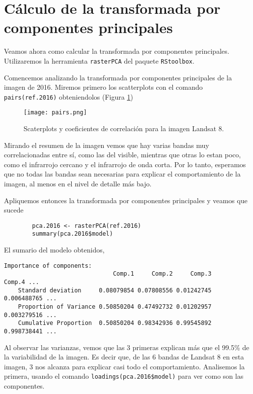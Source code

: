 \section{C\'alculo de la transformada por componentes principales}

Veamos ahora como calcular la transformada por componentes principales. Utilizaremos la
herramienta \texttt{rasterPCA} del paquete \texttt{RStoolbox}.

\begin{exa}
    Comencemos analizando la transformada por componentes principales de la
    imagen de 2016. Miremos primero los scatterplots con el comando \texttt{pairs(ref.2016)}
    obteniendolos (Figura \ref{fig:pairs2})
    \begin{figure}[h!]
    \begin{center}
        \texttt{[image: pairs.png]}
    \end{center}
    \caption{Scaterplots y coeficientes de correlaci\'on para la imagen Landsat 8.}
    \label{fig:pairs2}
    \end{figure}

    Mirando el resumen de la imagen vemos que hay varias bandas muy
    correlacionadas entre s\'i, como las del visible, mientras que otras lo
    estan poco, como el infrarrojo cercano y el infrarrojo de onda corta. Por lo tanto, esperamos que no
    todas las bandas sean necesarias para explicar el comportamiento de la
    imagen, al menos en el nivel de detalle m\'as bajo.

    Apliquemos entonces la transformada por componentes principales y veamos que
    sucede

    \begin{lstlisting}
        pca.2016 <- rasterPCA(ref.2016)
        summary(pca.2016$model)
    \end{lstlisting}

    El sumario del modelo obtenidos,
    \begin{Verbatim}[fontsize=\small]
    Importance of components:
                               Comp.1     Comp.2     Comp.3      Comp.4 ...
    Standard deviation     0.08079854 0.07808556 0.01242745 0.006488765 ...
    Proportion of Variance 0.50850204 0.47492732 0.01202957 0.003279516 ...
    Cumulative Proportion  0.50850204 0.98342936 0.99545892 0.998738441 ...
    \end{Verbatim}

    Al observar las varianzas, vemos que las 3 primeras explican m\'as que el
    99.5\% de la variabilidad de la imagen. Es decir que, de las 6 bandas de
    Landsat 8 en esta imagen, 3 nos alcanza para explicar casi todo el
    comportamiento. Analisemos la primera, usando el comando
    \texttt{loadings(pca.2016\$model)} para ver como son las componentes.


\end{exa}
